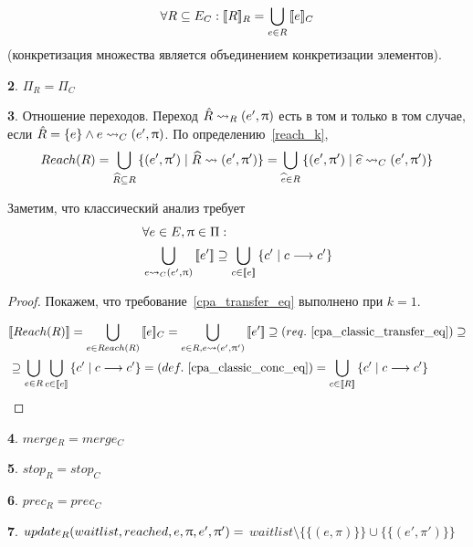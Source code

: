 \begin{equation}
\label{cpa_classic_conc_eq}
\begin{aligned}
\forall R\subseteq E_C: [\![ R ]\!]_R = \bigcup_{e\in R}{[\![ e ]\!]_C}
\end{aligned}
\end{equation}
(конкретизация множества является объединением конкретизации элементов).

{\textbf 2.} $\Pi_R=\Pi_C$

{\textbf 3.} Отношение переходов.
Переход $\hat R \leadsto_R (e', \uppi)$ есть в том и только в том случае, если
$\hat R = \{e\} \land e \leadsto_C (e',\uppi)$.
По определению~\ref{reach_k}, $$Reach(R) = \bigcup_{\widehat{R} \subseteq R}{\{(e', \uppi') \mid \widehat{R} \leadsto (e', \uppi')\}} = \bigcup_{\widehat{e} \in R}{\{(e', \uppi') \mid \widehat{e} \leadsto_C (e', \uppi')\}}$$

Заметим, что классический анализ требует
\begin{equation}
\label{cpa_classic_transfer_eq}
\begin{aligned}
& \forall e \in E, \uppi \in \Pi: \\
& \bigcup_{e \leadsto_C (e', \uppi)}{[\![ e' ]\!]} \supseteq \bigcup_{c \in [\![ e ]\!]}{\{c' \mid c \longrightarrow c'\}}
\end{aligned}
\end{equation}

\begin{proof}
Покажем, что требование~\ref{cpa_transfer_eq} выполнено при $k = 1$.

\begin{align}
& \conc{Reach(R)} = \bigcup_{e\in Reach(R)}{\conc{e}_C} = \bigcup_{e \in R, e \tatarrow (e', \pi')}{\conc{e'}} \supseteq (req.~\ref{cpa_classic_transfer_eq}) \supseteq \nonumber \\
& \supseteq \bigcup_{e \in R} {\bigcup_{c \in \conc{e}}{\{c' \mid c \tcarrow c'\}}} = (def.~\ref{cpa_classic_conc_eq}) = \bigcup_{c \in \conc{R}}{\{c' \mid c \tcarrow c'\}} \nonumber
\end{align}
\end{proof}

{\textbf 4.} $merge_R = merge_C$

{\textbf 5.} $stop_R = stop_C$

{\textbf 6.} $prec_R = prec_C$

{\textbf 7.}
$update_R(waitlist, reached, e, \uppi, e', \uppi')=$ 
$waitlist \setminus \{\{(e, \pi)\}\} \cup \{\{(e', \pi')\}\}$

